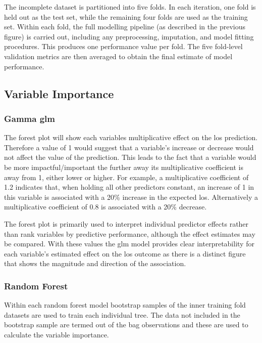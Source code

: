 \documentclass[11pt]{article}
\begin{document}
The incomplete dataset is partitioned into five folds. In each iteration, one fold is held out as the test set, while the remaining four folds are used as the training set. Within each fold, the full modelling pipeline (as described in the previous figure) is carried out, including any preprocessing, imputation, and model fitting procedures. This produces one performance value per fold. The five fold-level validation metrics are then averaged to obtain the final estimate of model performance.

\subsection{Variable Importance}

\subsubsection{Gamma \gls{glm}}

The forest plot will show each variables multiplicative effect on the \gls{los} prediction. Therefore a value of 1 would suggest that a variable's increase or decrease would not affect the value of the prediction. This leads to the fact that a variable would be more impactful/important the further away its multiplicative coefficient is away from 1, either lower or higher. For example, a multiplicative coefficient of 1.2 indicates that, when holding all other predictors constant, an increase of 1 in this variable is associated with a 20\% increase in the expected \gls{los}. Alternatively a multiplicative coefficient of 0.8 is associated with a 20\% decrease.
 
The forest plot is primarily used to interpret individual predictor effects rather than rank variables by predictive performance, although the effect estimates may be compared. With these values the \gls{glm} model provides clear interpretability\cite{Song2013} for each variable's estimated effect on the \gls{los} outcome as there is a distinct figure that shows the magnitude and direction of the association.

\subsubsection{Random Forest}

Within each random forest model bootstrap samples of the inner training fold datasets are used to train each individual tree. The data not included in the bootstrap sample are termed out of the bag observations and these are used to calculate the variable importance. 
\end{document}
